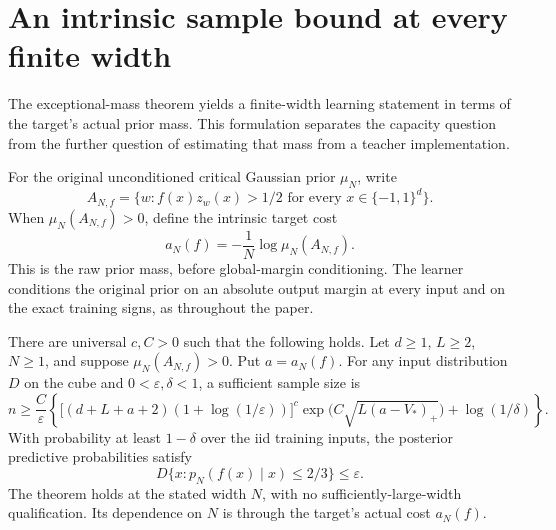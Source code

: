 \section{An intrinsic sample bound at every finite width}
\label{sec:critical-intrinsic-finite-width-learning}

The exceptional-mass theorem yields a finite-width learning statement in
terms of the target's actual prior mass. This formulation separates the
capacity question from the further question of estimating that mass from
a teacher implementation.

For the original unconditioned critical Gaussian prior $\mu_N$, write
\[
 A_{N,f}=\{w:f(x)z_w(x)>1/2\text{ for every }x\in\{-1,1\}^d\}.
\]
When $\mu_N(A_{N,f})>0$, define the intrinsic target cost
\[
 a_N(f)=-\frac1N\log\mu_N(A_{N,f}).
\]
This is the raw prior mass, before global-margin conditioning.
The learner conditions the original prior on an absolute output margin
at every input and on the exact training signs, as throughout the paper.

\begin{theorem}
\label{thm:critical-intrinsic-finite-width-learning}
There are universal $c,C>0$ such that the following holds. Let $d\ge1$,
$L\ge2$, $N\ge1$, and suppose $\mu_N(A_{N,f})>0$.
Put $a=a_N(f)$. For any input distribution $D$ on the cube and
$0<\varepsilon,\delta<1$, a sufficient sample size is
\begin{equation}\label{eq:critical-intrinsic-finite-width-samples}
 n\ge\frac C\varepsilon\left\{
 \big[(d+L+a+2)(1+\log(1/\varepsilon))\big]^c
       \exp\!\big(C\sqrt{L(a-V_*)_+}\big)
       +\log(1/\delta)\right\}.
\end{equation}
With probability at least $1-\delta$ over the iid training inputs,
the posterior predictive probabilities satisfy
\[
 D\{x:p_N(f(x)\mid x)\le2/3\}\le\varepsilon.
\]
The theorem holds at the stated width $N$, with no sufficiently-large-width
qualification. Its dependence on $N$ is through the target's actual cost
$a_N(f)$.
\end{theorem}

